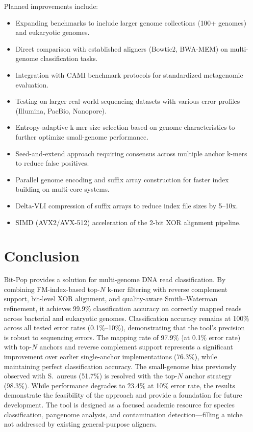 \documentclass[10pt]{article}
\begin{document}
Planned improvements include:
\begin{itemize}
    \item Expanding benchmarks to include larger genome collections (100+ genomes) and eukaryotic genomes.
    \item Direct comparison with established aligners (Bowtie2, BWA-MEM) on multi-genome classification tasks.
    \item Integration with CAMI benchmark protocols for standardized metagenomic evaluation.
    \item Testing on larger real-world sequencing datasets with various error profiles (Illumina, PacBio, Nanopore).
    \item Entropy-adaptive k-mer size selection based on genome characteristics to further optimize small-genome performance.
    \item Seed-and-extend approach requiring consensus across multiple anchor k-mers to reduce false positives.
    \item Parallel genome encoding and suffix array construction for faster index building on multi-core systems.
    \item Delta-VLI compression of suffix arrays to reduce index file sizes by 5--10x.
    \item SIMD (AVX2/AVX-512) acceleration of the 2-bit XOR alignment pipeline.
\end{itemize}

\section{Conclusion}

Bit-Pop provides a solution for multi-genome DNA read classification. By combining FM-index-based top-$N$ k-mer filtering with reverse complement support, bit-level XOR alignment, and quality-aware Smith--Waterman refinement, it achieves 99.9\% classification accuracy on correctly mapped reads across bacterial and eukaryotic genomes. Classification accuracy remains at 100\% across all tested error rates (0.1\%--10\%), demonstrating that the tool's precision is robust to sequencing errors. The mapping rate of 97.9\% (at 0.1\% error rate) with top-$N$ anchors and reverse complement support represents a significant improvement over earlier single-anchor implementations (76.3\%), while maintaining perfect classification accuracy. The small-genome bias previously observed with S.~aureus (51.7\%) is resolved with the top-$N$ anchor strategy (98.3\%). While performance degrades to 23.4\% at 10\% error rate, the results demonstrate the feasibility of the approach and provide a foundation for future development. The tool is designed as a focused academic resource for species classification, pangenome analysis, and contamination detection---filling a niche not addressed by existing general-purpose aligners.
\end{document}
